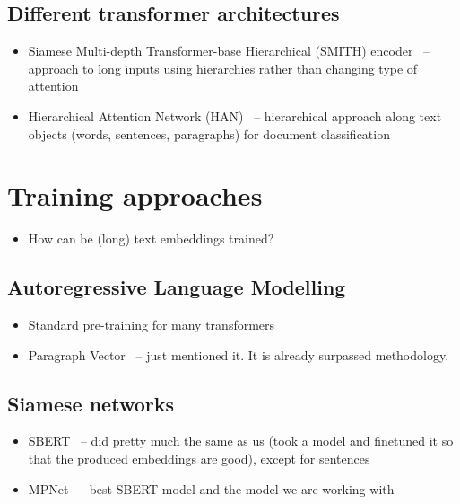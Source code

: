 \subsection{Different transformer architectures}

\begin{itemize}

    \item Siamese Multi-depth Transformer-base Hierarchical (SMITH)
    encoder~\cite{yang2020beyond} -- approach to long inputs using hierarchies
    rather than changing type of attention

    \item Hierarchical Attention Network (HAN)~\cite{yang2016hierarchical} --
    hierarchical approach along text objects (words, sentences, paragraphs) for
    document classification

\end{itemize}

\section{Training approaches}

\begin{itemize}

    \item How can be (long) text embeddings trained?

\end{itemize}

\subsection{Autoregressive Language Modelling}

\begin{itemize}

    \item Standard pre-training for many transformers

    \item Paragraph Vector~\cite{le2014distributed} -- just mentioned it. It is
    already surpassed methodology.


\end{itemize}

\subsection{Siamese networks}


\begin{itemize}

      \item SBERT~\cite{reimers2019sentence} -- did pretty much the same as us
        (took a model and finetuned it so that the produced embeddings are good),
        except for sentences

      \item MPNet~\cite{song2020mpnet} -- best SBERT model and the model we are
        working with

\end{itemize}

